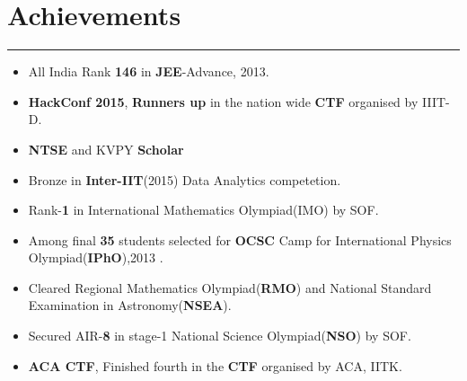 \documentclass[a4paper]{article}
\begin{document}
 \section*{Achievements}
 \hrule
 \vspace{3mm}
  \begin{itemize}
   \item All India Rank \textbf{146} in \textbf{JEE}-Advance, 2013.	
   \item \textbf{HackConf 2015}, \textbf{Runners up} in the nation wide \textbf{CTF} organised by IIIT-D.
   \item \textbf{NTSE} and KVPY \textbf{Scholar} 
   \item Bronze in \textbf{Inter-IIT}(2015) Data Analytics competetion.
   \item Rank-\textbf{1} in International Mathematics Olympiad(IMO) by SOF.
   \item Among final \textbf{35} students selected for \textbf{OCSC} Camp for International Physics Olympiad(\textbf{IPhO}),2013 .
   \item Cleared Regional Mathematics Olympiad(\textbf{RMO}) and National Standard Examination in Astronomy(\textbf{NSEA}).
   \item Secured AIR-\textbf{8} in stage-1 National Science Olympiad(\textbf{NSO}) by SOF.
   \item \textbf{ACA CTF}, Finished fourth in the \textbf{CTF} organised by ACA, IITK.
  \end{itemize}
 
 
\end{document}
